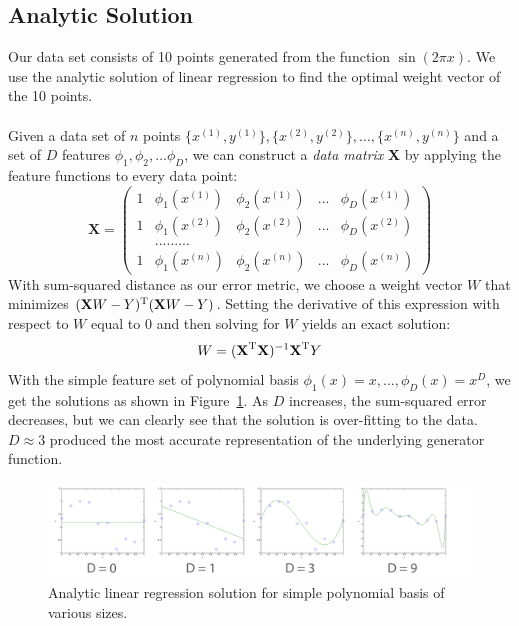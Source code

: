 \documentclass[10pt]{article}   %
\theoremstyle{plain}
\begin{document}
\subsection{Analytic Solution}
Our data set consists of 10 points generated from the function $\sin(2 \pi x)$. We  use the analytic solution of linear regression to find the optimal weight vector of the 10 points. \\
\\
\indent Given a data set of $n$ points $\{ x^{(1)}, y^{(1)} \}, \{ x^{(2)}, y^{(2)} \}, \ldots, \{ x^{(n)}, y^{(n)} \}$ and a set of $D$ features $\phi_1, \phi_2, \ldots \phi_D$, we can construct a \textit{data matrix} \textbf{X} by applying the feature functions to every data point: \\
	 \[ \textbf{X} = \left( \begin{array}{ccccc}
1 & \phi_1(x^{(1)}) & \phi_2(x^{(1)}) & ... & \phi_D(x^{(1)}) \\
1 & \phi_1(x^{(2)}) & \phi_2(x^{(2)}) & ... & \phi_D(x^{(2)}) \\
& ......... \\
1 & \phi_1(x^{(n)}) & \phi_2(x^{(n)}) & ... & \phi_D(x^{(n)}) \end{array} \right)\] 
With sum-squared distance as our error metric, we choose a weight vector $W$ that minimizes $(\textbf{X}W - Y)^\textnormal{T} (\textbf{X}W - Y)$. Setting the derivative of this expression with respect to $W$ equal to 0 and then solving for $W$ yields an exact solution:
\begin{equation} \label{eq-analytic}
	W = (\textbf{X}^\textnormal{T}\textbf{X})^{-1}\textbf{X}^{\textnormal{T}}Y
\end{equation}
\indent With the simple feature set of polynomial basis $\phi_1(x) = x,\ldots,\phi_D(x) = x^D$, we get the solutions as shown in Figure~\ref{fig-analytic}. As $D$ increases, the sum-squared error decreases, but we can clearly see that the solution is over-fitting to the data. $D \approx 3$ produced the most accurate representation of the underlying generator function. 
\begin{figure}[h!]\label{fig-analytic}
  \caption{Analytic linear regression solution for simple polynomial basis of various sizes.}
  \centering
    \includegraphics[width=1.0\textwidth]{figures/problem_2_1_full.png}
\end{figure}
\end{document}

